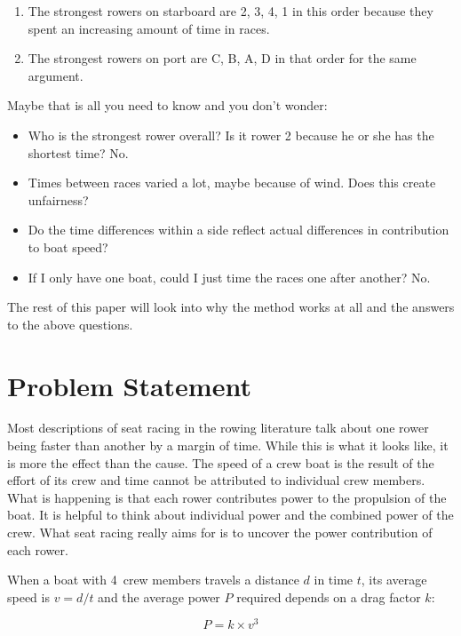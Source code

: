 \documentclass[a4paper,11pt]{article}
\begin{document}
\begin{enumerate}
\item The strongest rowers on starboard are 2, 3, 4, 1 in this order
because they spent an increasing amount of time in races.
\item The strongest rowers on port are C, B, A, D in that order for the
same argument.
\end{enumerate}

Maybe that is all you need to know and you don't wonder:

\begin{itemize}
\item Who is the strongest rower overall? Is it rower 2 because he or
she has the shortest time? No.
\item Times between races varied a lot, maybe because of wind. Does this
create unfairness?
\item Do the time differences within a side reflect actual differences
in contribution to boat speed?
\item If I only have one boat, could I just time the races one after
another? No.
\end{itemize}

The rest of this paper will look into why the method works at all and
the answers to the above questions.
\fi

\section{Problem Statement}

Most descriptions of seat racing in the rowing literature talk about
one rower being faster than another by a margin of time. While this is
what it looks like, it is more the effect than the cause. The speed 
of a crew boat is the result of the effort of its crew and time cannot
be attributed to individual crew members. What is happening is that each
rower contributes power to the propulsion of the boat.  It is helpful to
think about individual power and the combined power of the crew. What
seat racing really aims for is to uncover the power contribution of each
rower.

When a boat with 4~crew members travels a distance $d$ in time $t$, its
average speed is $v=d/t$ and the average power $P$ required
depends on a drag factor $k$:

\begin{equation}
\label{eq:p=kv3}
P = k \times v^3
\end{equation}
\end{document}
